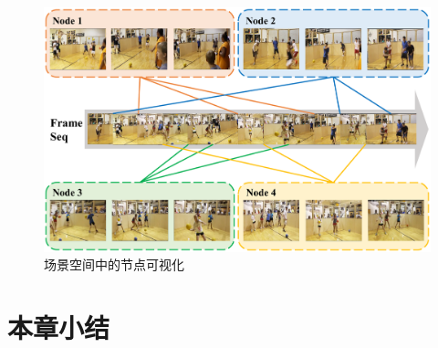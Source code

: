 \begin{figure}[tbp]
    \centering
    \includegraphics[width=0.8\linewidth]{chapter6/res/node_visualization.pdf}
    \caption{场景空间中的节点可视化}
    \label{ch6:fig:node_visualization}
\end{figure}

\section{本章小结}

